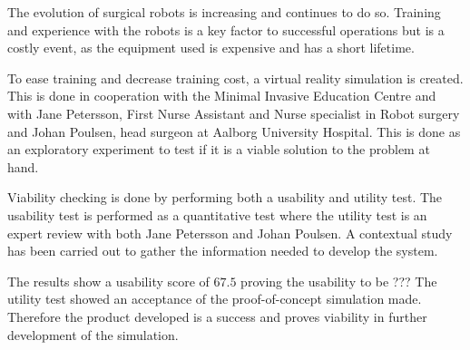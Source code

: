 The evolution of surgical robots is increasing and continues to do so. Training and experience with the robots is a key factor to successful operations but is a costly event, as the equipment used is expensive and has a short lifetime.

To ease training and decrease training cost, a virtual reality simulation is created. This is done in cooperation with the Minimal Invasive Education Centre and with Jane Petersson, First Nurse Assistant and Nurse specialist in Robot surgery and Johan Poulsen, head surgeon at Aalborg University Hospital.
This is done as an exploratory experiment to test if it is a viable solution to the problem at hand.

Viability checking is done by performing both a usability and utility test. The usability test is performed as a quantitative test where the utility test is an expert review with both Jane Petersson and Johan Poulsen. A contextual study has been carried out to gather the information needed to develop the system.

The results show a usability score of $67.5$ proving the usability to be ???
The utility test showed an acceptance of the proof-of-concept simulation made. Therefore the product developed is a success and proves viability in further development of the simulation.